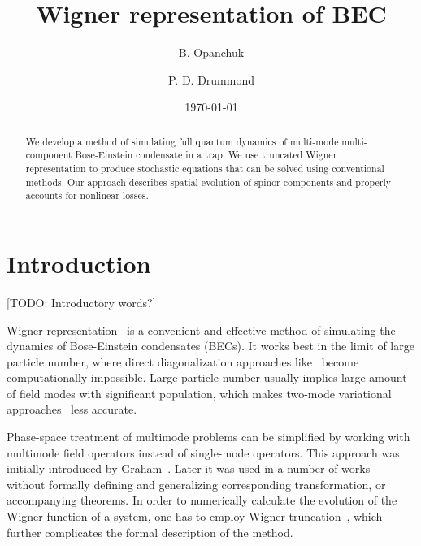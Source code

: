 \documentclass[12pt,aip,jmp,amssymb,amsmath]{revtex4-1}
\begin{document}
\title{Wigner representation of BEC}

\author{B. Opanchuk}
\author{P. D. Drummond}

\date{\today}
\begin{abstract}
We develop a method of simulating full quantum dynamics of multi-mode multi-component Bose-Einstein condensate in a trap.
We use truncated Wigner representation to produce stochastic equations that can be solved using conventional methods.
Our approach describes spatial evolution of spinor components and properly accounts for nonlinear losses.
\end{abstract}


\maketitle



\section{Introduction}

[TODO: Introductory words?]

Wigner representation~\cite{Gardiner2004} is a convenient and effective method of simulating the dynamics of Bose-Einstein condensates (BECs).
It works best in the limit of large particle number, where direct diagonalization approaches like~\cite{Sakmann2009} become computationally impossible.
Large particle number usually implies large amount of field modes with significant population, which makes two-mode variational approaches~\cite{Li2008,Li2009,Sinatra2011} less accurate.

Phase-space treatment of multimode problems can be simplified by working with multimode field operators instead of single-mode operators.
This approach was initially introduced by Graham~\cite{Graham1970,Graham1970a}.
Later it was used in a number of works~\cite{Steel1998,Isella2006,Norrie2006a} without formally defining and generalizing corresponding transformation, or accompanying theorems.
In order to numerically calculate the evolution of the Wigner function of a system, one has to employ Wigner truncation~\cite{Drummond1993,Steel1998,Sinatra2002}, which further complicates the formal description of the method.
\end{document}
